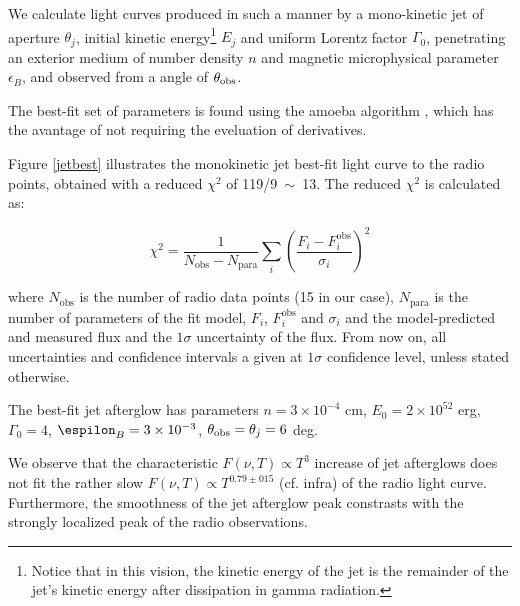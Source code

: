 We calculate light curves produced in such a manner by a mono-kinetic jet of aperture $\theta_j$, initial kinetic energy\footnote{Notice that in this vision, the kinetic energy of the jet is the remainder of the jet's kinetic energy after dissipation in gamma radiation.} $E_j$ and uniform Lorentz factor $\Gamma_0$, penetrating an exterior medium of number density $n$ and magnetic microphysical parameter $\epsilon_B$, and observed from a angle of $\theta_{\rm{obs}}$.

The best-fit set of parameters is found using the amoeba algorithm \citep{20}, which has the avantage of not requiring the eveluation of derivatives.


Figure \ref{jetbest} illustrates the monokinetic jet best-fit light curve to the radio points, obtained with a reduced $\chi^2$ of 119/9~$\sim$~13. The reduced $\chi^2$ is calculated as:

\begin{equation}
    \chi^2 = \frac{1}{N_\text{obs} - N_\text{para}} \sum_i\left( \frac{F_i - F_i^\text{obs}}{\sigma_i} \right)^2
\end{equation}

where $N_\text{obs}$ is the number of radio data points (15 in our case), $N_\text{para}$ is the number of parameters of the fit model, $F_i$, $F_i^\text{obs}$ and $\sigma_i$ and the model-predicted and measured flux and the $1\sigma$ uncertainty of the flux. From now on, all uncertainties and confidence intervals a given at $1\sigma$ confidence level, unless stated otherwise.

The best-fit jet afterglow has parameters $n = 3 \times 10^{-4}$ cm, $E_0 = 2 \times 10^52$ erg, $\Gamma_0 = 4$, $\espilon_B = 3 \times 10^{-3}$, $\thetaobs = \theta_j = 6$ deg.

We observe that the characteristic $F(\nu, T) \propto T^3$ increase of jet afterglows does not fit the rather slow $F(\nu, T) \propto T^{0.79\pm015}$ (cf. infra) of the radio light curve. Furthermore, the smoothness of the jet afterglow peak constrasts with the strongly localized peak of the radio observations.

